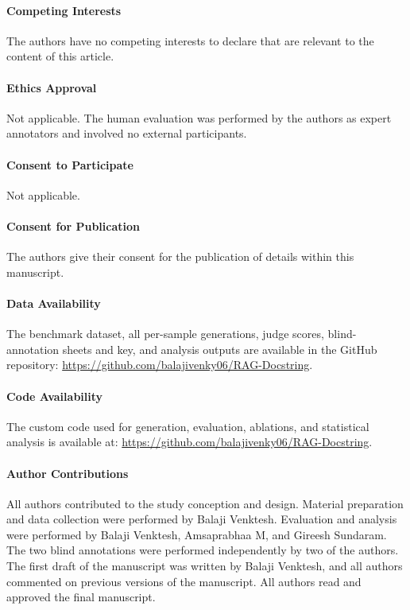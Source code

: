 \documentclass[pdflatex,sn-mathphys-ay]{sn-jnl}%
\theoremstyle{thmstyleone}%
\theoremstyle{thmstyletwo}%
\theoremstyle{thmstylethree}%
\begin{document}
\paragraph{Competing Interests}
The authors have no competing interests to declare that are relevant to the content of this article.

\paragraph{Ethics Approval}
{\color{blue}
Not applicable. The human evaluation was performed by the authors as expert annotators and involved no external participants.
}


\paragraph{Consent to Participate}
Not applicable.

\paragraph{Consent for Publication}
The authors give their consent for the publication of details within this manuscript.

\paragraph{Data Availability}
{\color{blue}
The benchmark dataset, all per-sample generations, judge scores, blind-annotation sheets and key, and analysis outputs are available in the GitHub repository: \url{https://github.com/balajivenky06/RAG-Docstring}.
}


\paragraph{Code Availability}
The custom code used for generation, evaluation, ablations, and statistical analysis is available at: \url{https://github.com/balajivenky06/RAG-Docstring}.

\paragraph{Author Contributions}
All authors contributed to the study conception and design. Material preparation and data collection were performed by Balaji Venktesh. Evaluation and analysis were performed by Balaji Venktesh, Amsaprabhaa M, and Gireesh Sundaram. {\color{blue}
The two blind annotations were performed independently by two of the authors.
}
 The first draft of the manuscript was written by Balaji Venktesh, and all authors commented on previous versions of the manuscript. All authors read and approved the final manuscript.
\end{document}
